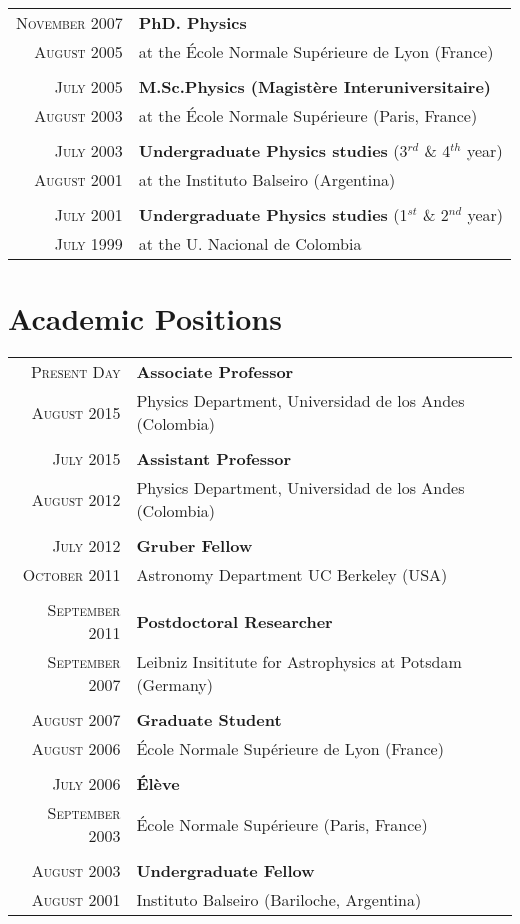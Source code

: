 \documentclass[a4paper,10pt]{article} %
\begin{document}
\begin{tabular}{rl}	
\textsc{November 2007} & {\bf PhD. Physics}\\
\textsc{August 2005}& at the \'Ecole Normale Sup\'erieure de Lyon (France) \\
&\\
\textsc{July 2005} & {\bf M.Sc.Physics (Magist\`ere Interuniversitaire)}\\  
\textsc{August 2003}& at the \'Ecole Normale Sup\'erieure (Paris, France) \\
&\\
\textsc{July 2003} & {\bf Undergraduate Physics studies} (3$^{rd}$ \& 4$^{th}$ year)\\
\textsc{August 2001} & at the Instituto Balseiro (Argentina)\\
&\\
\textsc{July 2001}  & {\bf Undergraduate Physics studies} (1$^{st}$ \& 2$^{nd}$ year)\\
\textsc{July 1999}& at the U. Nacional de Colombia\\
\end{tabular}

\color{red}
\section{Academic Positions}
\color{black}

\begin{tabular}{rl}	
 \textsc{Present Day} &  {\bf Associate Professor}\\
 \textsc{August 2015} & Physics Department, Universidad de los Andes (Colombia) \\
& \\
 \textsc{July 2015} &  {\bf Assistant Professor}\\
 \textsc{August 2012} & Physics Department, Universidad de los Andes (Colombia) \\
&\\
 \textsc{July 2012} &  {\bf Gruber Fellow}\\
 \textsc{October 2011} & Astronomy Department UC Berkeley (USA) \\
&\\
 \textsc{September 2011} &  {\bf Postdoctoral Researcher}\\
 \textsc{September 2007} & Leibniz Insititute for Astrophysics at Potsdam (Germany) \\ 
&\\
 \textsc{August 2007} &  {\bf Graduate Student}\\
 \textsc{August 2006} & \'Ecole Normale Sup\'erieure de Lyon (France)\\
&\\
 \textsc{July 2006} &  {\bf \'El\`eve}\\
 \textsc{September 2003} & \'Ecole Normale Sup\'erieure (Paris, France)\\
&\\
 \textsc{August 2003} &  {\bf Undergraduate Fellow}\\
 \textsc{August 2001} & Instituto Balseiro (Bariloche, Argentina)\\
\end{tabular}
\end{document}
